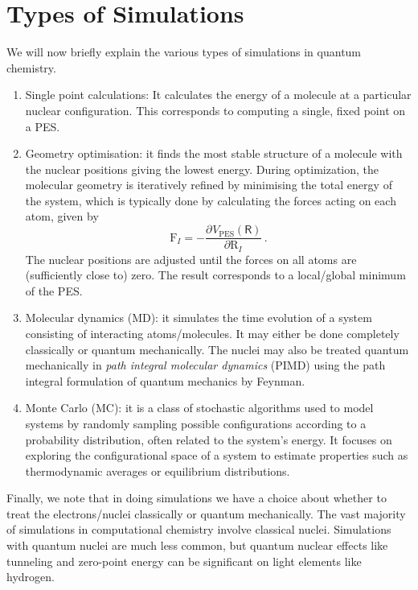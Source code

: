 \documentclass{article}
\theoremstyle{plain}\theoremheaderfont{\normalfont\itshape}\theorembodyfont{\rmfamily}\theoremseparator{.}\newtheorem*{rem}{Remark}\newtheorem*{ex}{Example}\newtheorem*{proof}{Proof}\newtheorem*{altp}{Alternative proof}
\theoremstyle{plain}\theoremheaderfont{\normalfont\bfseries}\theorembodyfont{\rmfamily}\theoremseparator{.}\newtheorem{thm}{Theorem}[section]\newtheorem{lem}[thm]{Lemma}\newtheorem{prop}[thm]{Proposition}\newtheorem*{cor}{Corollary}\newtheorem{defn}[thm]{Definition}\newtheorem{clm}[thm]{Claim}\newtheorem{clminproof}{Claim}\newtheorem{pos}{Postulate}[section]
\theoremstyle{break}\theoremheaderfont{\normalfont\itshape}\theorembodyfont{\rmfamily}\theoremseparator{.\medskip}\newtheorem*{proofskip}{Proof}\newtheorem*{exs}{Examples}\newtheorem*{rems}{Remarks}
\theoremstyle{break}\theoremheaderfont{\normalfont\bfseries}\theorembodyfont{\rmfamily}\theoremseparator{.\medskip}\newtheorem{lemskip}[thm]{Lemma}\newtheorem{defnskip}[thm]{Definition}\newtheorem{propskip}[thm]{Proposition}\newtheorem{thmskip}[thm]{Theorem}
\numberwithin{equation}{section}
\newcommand{\pdv}[3][]{\frac{\partial^{#1} #2}{{\partial #3}^{#1}}}
\newcommand{\vb}[1]{\bm{\mathrm{#1}}}
\begin{document}
    \section{Types of Simulations}
    We will now briefly explain the various types of simulations in quantum chemistry.
    \begin{enumerate}[topsep=0pt,label=(\roman*)]
        \item Single point calculations: It calculates the energy of a molecule at a particular nuclear configuration. This corresponds to computing a single, fixed point on a PES.
        \item Geometry optimisation: it finds the most stable structure of a molecule with the nuclear positions giving the lowest energy. During optimization, the molecular geometry is iteratively refined by minimising the total energy of the system, which is typically done by
        calculating the forces acting on each atom, given by
        \begin{equation}
            \vb{F}_I=-\pdv{V_{\text{PES}}(\mathsf{R})}{\vb{R}_I}\,.
        \end{equation}
        The nuclear positions are adjusted until the forces on all atoms are (sufficiently close to) zero. The result corresponds to a local/global minimum of the PES.
        \item Molecular dynamics (MD): it simulates the time evolution of a system consisting of interacting atoms/molecules. It may either be done completely classically or quantum mechanically. The nuclei may also be treated quantum mechanically in \textit{path integral molecular dynamics} (PIMD) using the path integral formulation of quantum mechanics by Feynman. 
        \item Monte Carlo (MC): it is a class of stochastic algorithms used to model systems by randomly sampling possible configurations according to a probability distribution, often related to the system's energy. It focuses on exploring the configurational space of a system to estimate properties such as thermodynamic averages or equilibrium distributions.
    \end{enumerate}

    Finally, we note that in doing simulations we have a choice about whether to treat the electrons/nuclei classically or quantum mechanically. The vast majority of simulations in computational chemistry involve classical nuclei. Simulations with quantum nuclei are much less common, but quantum nuclear effects like tunneling and zero-point energy can be significant on light elements like hydrogen.
\end{document}
